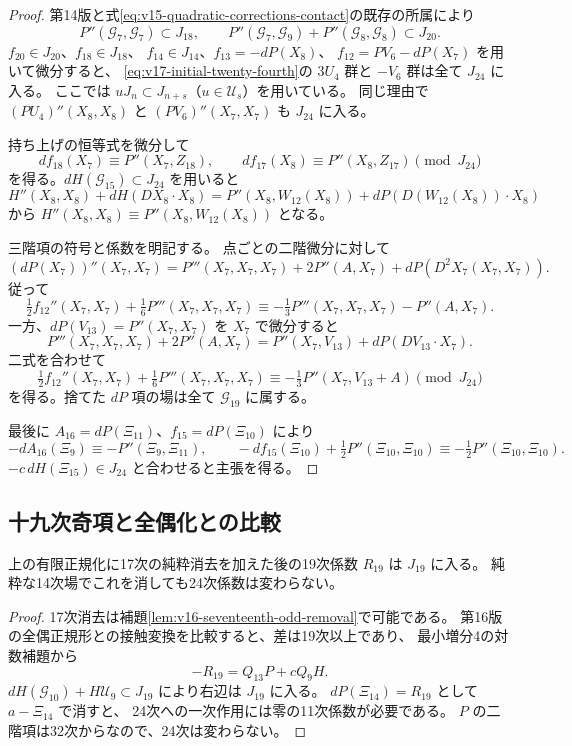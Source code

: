 \begin{proof}
第14版と式\eqref{eq:v15-quadratic-corrections-contact}の既存の所属により
\[
 P''(\mathcal G_7,\mathcal G_7)\subset J_{18},\qquad
 P''(\mathcal G_7,\mathcal G_9)+P''(\mathcal G_8,\mathcal G_8)\subset J_{20}.
\]
$f_{20}\in J_{20}$、$f_{18}\in J_{18}$、
$f_{14}\in J_{14}$、$f_{13}=-dP(X_8)$、
$f_{12}=PV_6-dP(X_7)$ を用いて微分すると、
\eqref{eq:v17-initial-twenty-fourth}の $3U_4$ 群と $-V_6$ 群は全て $J_{24}$ に入る。
ここでは $uJ_n\subset J_{n+s}$（$u\in\mathcal U_s$）を用いている。
同じ理由で $(PU_4)''(X_8,X_8)$ と $(PV_6)''(X_7,X_7)$ も $J_{24}$ に入る。

持ち上げの恒等式を微分して
\[
 df_{18}(X_7)\equiv P''(X_7,Z_{18}),\qquad
 df_{17}(X_8)\equiv P''(X_8,Z_{17})\pmod{J_{24}}
\]
を得る。$dH(\mathcal G_{15})\subset J_{24}$ を用いると
\[
 H''(X_8,X_8)+dH(DX_8\cdot X_8)
   =P''(X_8,W_{12}(X_8))+dP(D(W_{12}(X_8))\cdot X_8)
\]
から $H''(X_8,X_8)\equiv P''(X_8,W_{12}(X_8))$ となる。

三階項の符号と係数を明記する。
点ごとの二階微分に対して
\[
 (dP(X_7))''(X_7,X_7)
  =P'''(X_7,X_7,X_7)+2P''(A,X_7)+dP(D^2X_7(X_7,X_7)).
\]
従って
\[
 \tfrac12f_{12}''(X_7,X_7)+\tfrac16P'''(X_7,X_7,X_7)
 \equiv-\tfrac13P'''(X_7,X_7,X_7)-P''(A,X_7).
\]
一方、$dP(V_{13})=P''(X_7,X_7)$ を $X_7$ で微分すると
\[
 P'''(X_7,X_7,X_7)+2P''(A,X_7)
 =P''(X_7,V_{13})+dP(DV_{13}\cdot X_7).
\]
二式を合わせて
\[
 \tfrac12f_{12}''(X_7,X_7)+\tfrac16P'''(X_7,X_7,X_7)
 \equiv-\tfrac13P''(X_7,V_{13}+A)\pmod{J_{24}}
\]
を得る。捨てた $dP$ 項の場は全て $\mathcal G_{19}$ に属する。

最後に $A_{16}=dP(\Xi_{11})$、$f_{15}=dP(\Xi_{10})$ により
\[
 -dA_{16}(\Xi_9)\equiv-P''(\Xi_9,\Xi_{11}),\qquad
 -df_{15}(\Xi_{10})+\tfrac12P''(\Xi_{10},\Xi_{10})
       \equiv-\tfrac12P''(\Xi_{10},\Xi_{10}).
\]
$-c\,dH(\Xi_{15})\in J_{24}$ と合わせると主張を得る。
\end{proof}

\subsection{十九次奇項と全偶化との比較}

\begin{lemma}[十九次の純粋消去]
\label{lem:v17-nineteenth-odd-removal}
上の有限正規化に17次の純粋消去を加えた後の19次係数 $R_{19}$ は $J_{19}$ に入る。
純粋な14次場でこれを消しても24次係数は変わらない。
\end{lemma}

\begin{proof}
17次消去は補題\ref{lem:v16-seventeenth-odd-removal}で可能である。
第16版の全偶正規形との接触変換を比較すると、差は19次以上であり、
最小増分4の対数補題から
\[
                        -R_{19}=Q_{13}P+cQ_9H.
\]
$dH(\mathcal G_{10})+H\mathcal U_9\subset J_{19}$ により右辺は $J_{19}$ に入る。
$dP(\Xi_{14})=R_{19}$ として $a-\Xi_{14}$ で消すと、
24次への一次作用には零の11次係数が必要である。
$P$ の二階項は32次からなので、24次は変わらない。
\end{proof}

